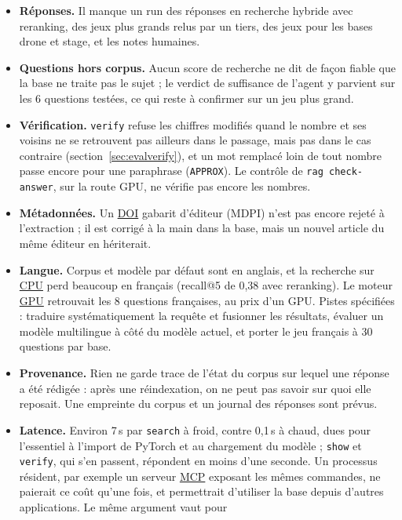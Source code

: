 \documentclass[11pt,a4paper]{article}
\newcommand{\cmd}[1]{\texttt{#1}}
\newcommand{\gl}[2]{\hyperlink{gl:#1}{\textcolor{glcolor}{#2}}}
\begin{document}
\begin{itemize}
    lire par \cmd{/paper-ask}, qui devrait y gagner sur les questions de synthèse.
  \item \textbf{Réponses.} Il manque un run des réponses en recherche hybride avec reranking,
    des jeux plus grands relus par un tiers, des jeux pour les bases drone et stage, et les
    notes humaines.
  \item \textbf{Questions hors corpus.} Aucun score de recherche ne dit de façon fiable que la
    base ne traite pas le sujet ; le verdict de suffisance de l'agent y parvient sur les 6
    questions testées, ce qui reste à confirmer sur un jeu plus grand.
  \item \textbf{Vérification.} \cmd{verify} refuse les chiffres modifiés quand le nombre et ses
    voisins ne se retrouvent pas ailleurs dans le passage, mais pas dans le cas contraire
    (section~\ref{sec:evalverify}), et un mot remplacé loin de tout nombre passe encore pour
    une paraphrase (\cmd{APPROX}). Le contrôle de \cmd{rag check-answer}, sur la route GPU,
    ne vérifie pas encore les nombres.
  \item \textbf{Métadonnées.} Un \gl{DOI}{DOI} gabarit d'éditeur (MDPI) n'est pas encore rejeté à
    l'extraction ; il est corrigé à la main dans la base, mais un nouvel article du même
    éditeur en hériterait.
  \item \textbf{Langue.} Corpus et modèle par défaut sont en anglais, et la recherche sur
    \gl{CPU}{CPU} perd beaucoup en français (recall@5 de 0,38 avec reranking). Le moteur \gl{GPU}{GPU}
    retrouvait les 8 questions françaises, au prix d'un GPU. Pistes spécifiées : traduire
    systématiquement la requête et fusionner les résultats, évaluer un modèle multilingue à
    côté du modèle actuel, et porter le jeu français à 30 questions par base.
  \item \textbf{Provenance.} Rien ne garde trace de l'état du corpus sur lequel une réponse a
    été rédigée : après une réindexation, on ne peut pas savoir sur quoi elle reposait. Une
    empreinte du corpus et un journal des réponses sont prévus.
  \item \textbf{Latence.} Environ 7\,s par \cmd{search} à froid, contre 0,1\,s à chaud,
    dues pour l'essentiel à l'import de PyTorch et au chargement du modèle ; \cmd{show} et
    \cmd{verify}, qui s'en passent, répondent en moins d'une seconde. Un processus résident, par exemple
    un serveur \gl{MCP}{MCP} exposant les mêmes commandes, ne paierait ce coût qu'une fois, et
    permettrait d'utiliser la base depuis d'autres applications. Le même argument vaut pour

\end{itemize}
\end{document}
